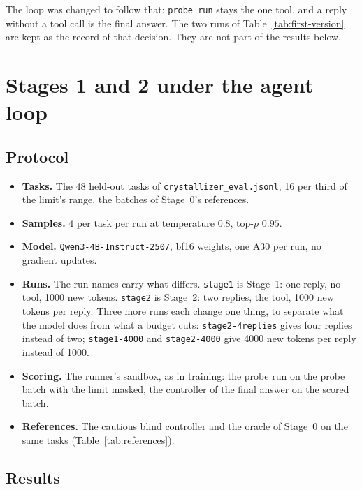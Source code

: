 \documentclass[11pt,a4paper]{article}
\begin{document}
The loop was changed to follow that: \texttt{probe\_run} stays the one
tool, and a reply without a tool call is the final answer. The two runs of
Table~\ref{tab:first-version} are kept as the record of that decision. They
are not part of the results below.

\section{Stages 1 and 2 under the agent loop}
\label{sec:results}

\subsection{Protocol}

\begin{itemize}[leftmargin=1.5em]
  \item \textbf{Tasks.} The 48 held-out tasks of
  \texttt{crystallizer\_eval.jsonl}, 16 per third of the limit's range, the
  batches of Stage~0's references.
  \item \textbf{Samples.} 4 per task per run at temperature $0.8$, top-$p$
  $0.95$.
  \item \textbf{Model.} \texttt{Qwen3-4B-Instruct-2507}, bf16 weights, one
  A30 per run, no gradient updates.
  \item \textbf{Runs.} The run names carry what differs.
  \texttt{stage1} is Stage~1: one reply, no tool, 1000 new tokens.
  \texttt{stage2} is Stage~2: two replies, the tool, 1000 new tokens per
  reply. Three more runs each change one thing, to separate what the model
  does from what a budget cuts: \texttt{stage2-4replies} gives four replies
  instead of two; \texttt{stage1-4000} and \texttt{stage2-4000} give 4000
  new tokens per reply instead of 1000.
  \item \textbf{Scoring.} The runner's sandbox, as in training: the probe
  run on the probe batch with the limit masked, the controller of the final
  answer on the scored batch.
  \item \textbf{References.} The cautious blind controller and the oracle of
  Stage~0 on the same tasks (Table~\ref{tab:references}).
\end{itemize}

\subsection{Results}

\begin{table}[h]
\centering\small
\resizebox{\linewidth}{!}{}
\caption{The runs on the held-out tasks, next to the Stage~0 references.
Ride ratio and estimate error are means over the samples that have them.}
\label{tab:comparison}
\end{table}
\end{document}
